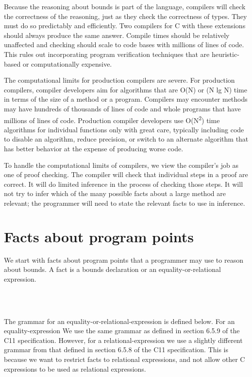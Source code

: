Because the reasoning about bounds is part of the language, compilers
will check the correctness of the reasoning, just as they check the
correctness of types. They must do so predictably and efficiently. Two
compilers for C with these extensions should always produce the same
answer. Compile times should be relatively unaffected and checking
should scale to code bases with millions of lines of code. This rules
out incorporating program verification techniques that are
heuristic-based or computationally expensive.

The computational limits for production compilers are severe. For
production compilers, compiler developers aim for algorithms that are
O(N) or (N lg N) time in terms of the size of a method or a program.
Compilers may encounter methods may have hundreds of thousands of lines
of code and whole programs that have millions of lines of code.
Production compiler developers use O(N\textsuperscript{2}) time
algorithms for individual functions only with great care, typically
including code to disable an algorithm, reduce precision, or switch to
an alternate algorithm that has better behavior at the expense of
producing worse code.

To handle the computational limits of compilers, we view the compiler's
job as one of proof checking. The compiler will check that individual
steps in a proof are correct. It will do limited inference in the
process of checking those steps. It will not try to infer which of the
many possible facts about a large method are relevant; the programmer
will need to state the relevant facts to use in inference.

\section{Facts about program points}

We start with facts about program points that a programmer may use to reason
about bounds. A fact is a bounds declaration or an equality-or-relational
expression.

\begin{tabbing}
\=\\
\>  \\
\> 
\end{tabbing}

The grammar for an equality-or-relational-expression is defined below. For an
equality-expression We use the same grammar as defined in section 6.5.9 of the
C11 specification. However, for a relational-expression we use a slightly
different grammar from that defined in section 6.5.8 of the C11 specification.
This is because we want to restrict facts to relational expressions, and not
allow other C expressions to be used as relational expressions.

